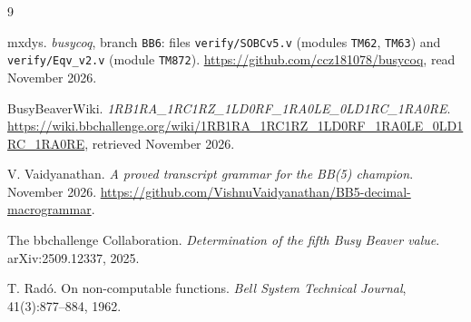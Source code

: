 \documentclass[11pt]{article}
\theoremstyle{remark}
\begin{document}
\begin{thebibliography}{9}

mxdys. \emph{busycoq}, branch \texttt{BB6}: files \texttt{verify/SOBCv5.v}
(modules \texttt{TM62}, \texttt{TM63}) and \texttt{verify/Eqv\_v2.v} (module
\texttt{TM872}). \url{https://github.com/ccz181078/busycoq}, read November 2026.

BusyBeaverWiki. \emph{1RB1RA\_1RC1RZ\_1LD0RF\_1RA0LE\_0LD1RC\_1RA0RE}.
\url{https://wiki.bbchallenge.org/wiki/1RB1RA_1RC1RZ_1LD0RF_1RA0LE_0LD1RC_1RA0RE},
retrieved November 2026.

V. Vaidyanathan. \emph{A proved transcript grammar for the BB(5) champion}.
November 2026.
\url{https://github.com/VishnuVaidyanathan/BB5-decimal-macrogrammar}.

The bbchallenge Collaboration. \emph{Determination of the fifth Busy Beaver
value}. arXiv:2509.12337, 2025.

T. Rad\'o. On non-computable functions. \emph{Bell System Technical Journal},
41(3):877--884, 1962.

\end{thebibliography}
\end{document}
